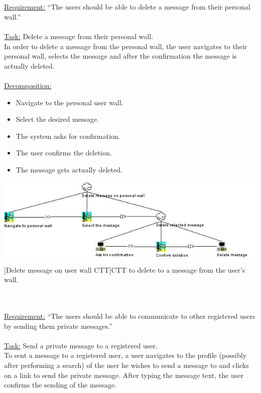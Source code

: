 \documentclass[11pt, a4paper,svglistings,oneside]{book}
\begin{document}
$\;$ \\ \\
\underline{Requirement:} ``The users should be able to delete a message from their personal wall.'' \\ \\
\underline{Task:} Delete a message from their personal wall. \\
In order to delete a message from the personal wall, the user navigates to their personal wall, selects the message and after the confirmation the message is actually deleted. \\ \\ 
\underline{Decomposition:}
\begin{itemize}
\item Navigate to the personal user wall.
\item Select the desired message.
\item The system asks for confirmation.
\item The user confirms the deletion.
\item The message gets actually deleted.
\end{itemize}
\noindent\begin{minipage}{\textwidth}
    \centering
   \includegraphics[width=\textwidth]{CTT_Delete_Message.png}
 [Delete message on user wall CTT]{CTT to delete to a message from the user's wall.}
\end{minipage}
$\;$ \\ \\
\underline{Requirement:} ``The users should be able to communicate to other registered users by sending them private messages.'' \\ \\
\underline{Task:} Send a private message to a registered user. \\
To sent a message to a registered user, a user navigates to the profile (possibly after performing a search) of the user he wishes to send a message to and clicks on a link to send the private message. After typing the message text, the user confirms the sending of the message.\\ \\
\end{document}
